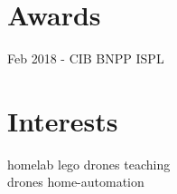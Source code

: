 \documentclass[letterpaper]{deedy-resume} %
\begin{document}
\begin{minipage}[t]{0.28\textwidth}
\sectionspace %

\section{Awards}
Feb 2018 - CIB BNPP ISPL

\sectionspace %

\section{Interests}
homelab \textbullet{} lego \textbullet{} drones \textbullet{} teaching \\
drones \textbullet{} home-automation

\end{minipage} %
\hfill
%
%
\end{document}
